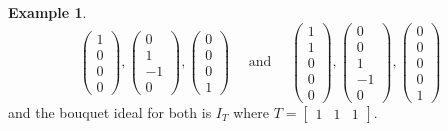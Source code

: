 \documentclass[a4paper, 12pt]{article}
\theoremstyle{plain}
\theoremstyle{definition}
\newtheorem{example}[theorem]{Example}
\theoremstyle{remark}
\begin{document}
\begin{example}
$$\begin{pmatrix}1\\0\\0\\0\end{pmatrix},\begin{pmatrix}0\\1\\-1\\0\end{pmatrix},\begin{pmatrix}0\\0\\0\\1\end{pmatrix} \quad \text{ and } \quad \begin{pmatrix}1\\1\\0\\0\\0\end{pmatrix},\begin{pmatrix}0\\0\\1\\-1\\0\end{pmatrix},\begin{pmatrix}0\\0\\0\\0\\1\end{pmatrix}$$
and the bouquet ideal for both is $I_T$ where $T=\begin{bmatrix} 1 & 1 & 1 \end{bmatrix}$.


\end{example}
\end{document}
